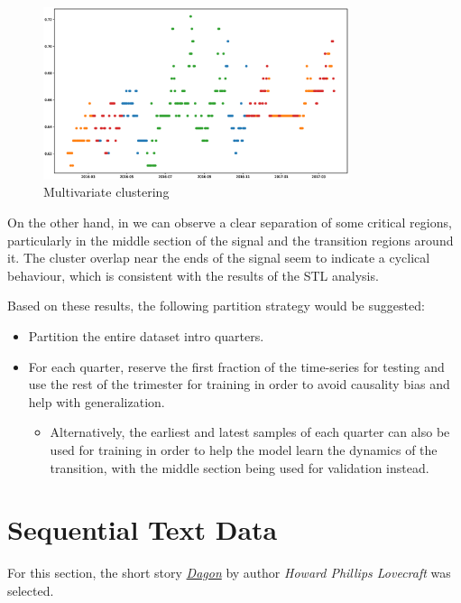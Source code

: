 \documentclass{scrartcl}
\begin{document}
  \begin{figure}[ht]
    \centering
    \includegraphics[width=0.8\textwidth]{./figures/clustered_by_input.eps}
    \caption{Multivariate clustering}
    \label{fig:multivariate_clustering}
  \end{figure}

  On the other hand, in  we can observe a clear separation of some critical regions, particularly in the middle section of the signal and the transition regions around it. The cluster overlap near the ends of the signal seem to indicate a cyclical behaviour, which is consistent with the results of the STL analysis.

  Based on these results, the following partition strategy would be suggested:

  \begin{itemize}
    \item Partition the entire dataset intro quarters.
    \item For each quarter, reserve the first fraction of the time-series for testing and use the rest of the trimester for training in order to avoid causality bias and help with generalization.
    \begin{itemize}
      \item Alternatively, the earliest and latest samples of each quarter can also be used for training in order to help the model learn the dynamics of the transition, with the middle section being used for validation instead.
    \end{itemize}
  \end{itemize}

\section{Sequential Text Data}

  For this section, the short story \href{https://www.hplovecraft.com/writings/texts/fiction/d.aspx}{\textit{Dagon}} by author \textit{Howard Phillips Lovecraft} was selected.
\end{document}
